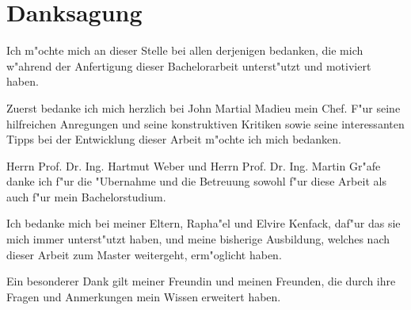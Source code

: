 \chapter{Danksagung}
Ich m"ochte mich an dieser Stelle bei allen derjenigen bedanken, die mich w"ahrend der Anfertigung dieser Bachelorarbeit unterst"utzt und motiviert haben.

Zuerst bedanke ich mich herzlich bei John Martial Madieu mein Chef. F"ur seine hilfreichen Anregungen und seine konstruktiven Kritiken sowie seine interessanten Tipps bei der Entwicklung dieser Arbeit m"ochte ich mich bedanken.

Herrn Prof. Dr. Ing. Hartmut Weber und Herrn Prof. Dr. Ing. Martin Gr"afe danke ich f"ur die "Ubernahme und die Betreuung sowohl f"ur diese Arbeit als auch f"ur mein Bachelorstudium.

Ich bedanke mich bei meiner Eltern, Rapha"el und Elvire Kenfack, daf"ur das sie mich immer unterst"utzt haben, und meine bisherige Ausbildung, welches nach dieser Arbeit zum Master weitergeht, erm"oglicht haben. 

Ein besonderer Dank gilt meiner Freundin und meinen Freunden, die durch ihre Fragen und Anmerkungen mein Wissen erweitert haben.\\
\\[6ex]
 
%
%
